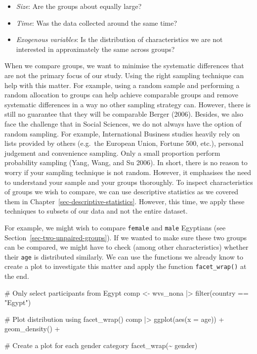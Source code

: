 \documentclass[
  letterpaper,
]{krantz}
\makeatletter
\newenvironment{Shaded}{\begin{snugshade}}{\end{snugshade}}
\newcommand{\AttributeTok}[1]{\textcolor[rgb]{0.40,0.45,0.13}{#1}}
\newcommand{\CommentTok}[1]{\textcolor[rgb]{0.37,0.37,0.37}{#1}}
\newcommand{\FunctionTok}[1]{\textcolor[rgb]{0.28,0.35,0.67}{#1}}
\newcommand{\NormalTok}[1]{\textcolor[rgb]{0.00,0.23,0.31}{#1}}
\newcommand{\OtherTok}[1]{\textcolor[rgb]{0.00,0.23,0.31}{#1}}
\newcommand{\SpecialCharTok}[1]{\textcolor[rgb]{0.37,0.37,0.37}{#1}}
\newcommand{\StringTok}[1]{\textcolor[rgb]{0.13,0.47,0.30}{#1}}
\newenvironment{kframe}{%
\medskip{}
\setlength{\fboxsep}{.8em}
 \def\at@end@of@kframe{}%
 \ifinner\ifhmode%
  \def\at@end@of@kframe{\end{minipage}}%
  \begin{minipage}{\columnwidth}%
 \fi\fi%
 \def\FrameCommand##1{\hskip\@totalleftmargin \hskip-\fboxsep
 \colorbox{shadecolor}{##1}\hskip-\fboxsep
     \hskip-\linewidth \hskip-\@totalleftmargin \hskip\columnwidth}%
 \MakeFramed {\advance\hsize-\width
   \@totalleftmargin\z@ \linewidth\hsize
   \@setminipage}}%
 {\par\unskip\endMakeFramed%
 \at@end@of@kframe}
\renewenvironment{Shaded}{\begin{kframe}}{\end{kframe}}
\makeatother
\begin{document}
\begin{itemize}
\item
  \emph{Size}: Are the groups about equally large?
\item
  \emph{Time}: Was the data collected around the same time?
\item
  \emph{Exogenous variables}: Is the distribution of characteristics we
  are not interested in approximately the same across groups?
\end{itemize}

When we compare groups, we want to minimise the systematic differences
that are not the primary focus of our study. Using the right sampling
technique can help with this matter. For example, using a random sample
and performing a random allocation to groups can help achieve comparable
groups and remove systematic differences in a way no other sampling
strategy can. However, there is still no guarantee that they will be
comparable Berger (2006). Besides, we also face the challenge that in
Social Sciences, we do not always have the option of random sampling.
For example, International Business studies heavily rely on lists
provided by others (e.g.~the European Union, Fortune 500, etc.),
personal judgement and convenience sampling. Only a small proportion
perform probability sampling (Yang, Wang, and Su 2006). In short, there
is no reason to worry if your sampling technique is not random. However,
it emphasises the need to understand your sample and your groups
thoroughly. To inspect characteristics of groups we wish to compare, we
can use descriptive statistics as we covered them in
Chapter~\ref{sec-descriptive-statistics}. However, this time, we apply
these techniques to subsets of our data and not the entire dataset.

For example, we might wish to compare \texttt{female} and \texttt{male}
Egyptians (see Section~\ref{sec-two-unpaired-groups}). If we wanted to
make sure these two groups can be compared, we might have to check
(among other characteristics) whether their \texttt{age} is distributed
similarly. We can use the functions we already know to create a plot to
investigate this matter and apply the function \texttt{facet\_wrap()} at
the end.

\begin{Shaded}
\begin{Highlighting}[]
\CommentTok{\# Only select participants from \textquotesingle{}Egypt\textquotesingle{}}
\NormalTok{comp }\OtherTok{\textless{}{-}}
\NormalTok{  wvs\_nona }\SpecialCharTok{|\textgreater{}}
  \FunctionTok{filter}\NormalTok{(country }\SpecialCharTok{==} \StringTok{"Egypt"}\NormalTok{)}

\CommentTok{\# Plot distribution using facet\_wrap()}
\NormalTok{comp }\SpecialCharTok{|\textgreater{}}
  \FunctionTok{ggplot}\NormalTok{(}\FunctionTok{aes}\NormalTok{(}\AttributeTok{x =}\NormalTok{ age)) }\SpecialCharTok{+}
  \FunctionTok{geom\_density}\NormalTok{() }\SpecialCharTok{+}
  
  \CommentTok{\# Create a plot for each gender category}
  \FunctionTok{facet\_wrap}\NormalTok{(}\SpecialCharTok{\textasciitilde{}}\NormalTok{ gender)}
\end{Highlighting}
\end{Shaded}
\end{document}
